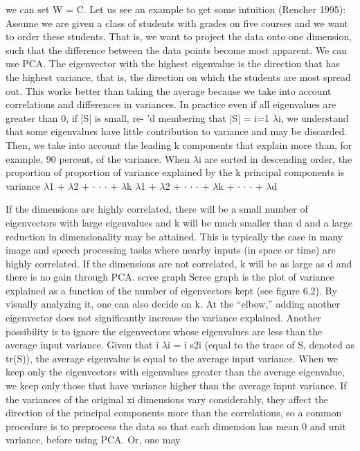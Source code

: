 we can set W = C. Let us see an example to get some intuition (Rencher 1995): Assume we are given a class of students with grades on five courses and we want to order these students. That is, we want to project the data onto one dimension, such that the difference between the data points become most apparent. We can use PCA. The eigenvector with the highest eigenvalue is the direction that has the highest variance, that is, the direction on which the students are most spread out. This works better than taking the average because we take into account correlations and differences in variances. In practice even if all eigenvalues are greater than 0, if |S| is small, re- 'd membering that |S| = i=1 $\lambda$i, we understand that some eigenvalues have little contribution to variance and may be discarded. Then, we take into account the leading k components that explain more than, for example, 90 percent, of the variance. When $\lambda$i are sorted in descending order, the proportion of proportion of variance explained by the k principal components is variance $\lambda$1 + $\lambda$2 + $\cdot$ $\cdot$ $\cdot$ + $\lambda$k $\lambda$1 + $\lambda$2 + $\cdot$ $\cdot$ $\cdot$ + $\lambda$k + $\cdot$ $\cdot$ $\cdot$ + $\lambda$d

If the dimensions are highly correlated, there will be a small number of eigenvectors with large eigenvalues and k will be much smaller than d and a large reduction in dimensionality may be attained. This is typically the case in many image and speech processing tasks where nearby inputs (in space or time) are highly correlated. If the dimensions are not correlated, k will be as large as d and there is no gain through PCA. scree graph Scree graph is the plot of variance explained as a function of the number of eigenvectors kept (see figure 6.2). By visually analyzing it, one can also decide on k. At the “elbow,” adding another eigenvector does not significantly increase the variance explained. Another possibility is to ignore the eigenvectors whose eigenvalues are less than the average input variance. Given that i $\lambda$i = i s2i (equal to the trace of S, denoted as tr(S)), the average eigenvalue is equal to the average input variance. When we keep only the eigenvectors with eigenvalues greater than the average eigenvalue, we keep only those that have variance higher than the average input variance. If the variances of the original xi dimensions vary considerably, they affect the direction of the principal components more than the correlations, so a common procedure is to preprocess the data so that each dimension has mean 0 and unit variance, before using PCA. Or, one may

